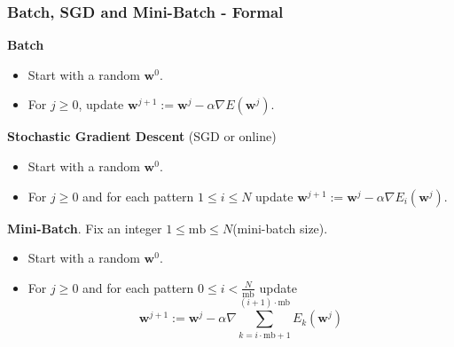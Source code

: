 \documentclass{beamer}
\begin{document}
	\begin{frame}
		\frametitle{Batch, SGD and Mini-Batch - Formal}
		\textbf{Batch}
		\begin{itemize}
			\item Start with a random $\bm{w}^0$.
			\item For $j \geq 0$, update $\bm{w}^{j+1} := \bm{w}^{j} - \alpha \nabla E(\bm{w}^j)$.
		\end{itemize}
		
		\textbf{Stochastic Gradient Descent} (SGD or online)
		\begin{itemize}
			\item Start with a random $\bm{w}^0$.
			\item For $j \geq 0$ and for each pattern $1\leq i \leq N$ update $\bm{w}^{j+1} := \bm{w}^{j} - \alpha \nabla E_i(\bm{w}^j)$.
		\end{itemize}
	
		\textbf{Mini-Batch}. Fix an integer $1 \leq \text{mb} \leq N$(mini-batch size).
		\begin{itemize}
			\item Start with a random $\bm{w}^0$.
			\item For $j \geq 0$ and for each pattern $0 \leq i < \frac{N}{\text{mb}}$ update
			\begin{equation*}
				\bm{w}^{j+1} := \bm{w}^{j} - \alpha \nabla \sum_{k=i\cdot\text{mb} + 1}^{(i+1)\cdot\text{mb}}E_k(\bm{w}^j)
			\end{equation*}
		\end{itemize}
		
	\end{frame}
\end{document}
